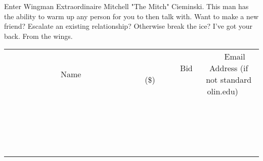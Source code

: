\documentclass[11pt]{article}
\begin{document}
Enter Wingman Extraordinaire Mitchell "The Mitch" Cieminski. This man has the ability to warm up any person for you to then talk with. Want to make a new friend? Escalate an existing relationship? Otherwise break the ice? I've got your back. From the wings.
\\[3ex]
\begin{tabular}{c c c}
~~~~~~~~~~~~~Name~~~~~~~~~~~~~ & ~~~~~~~~~Bid (\$)~~~~~~~~~  & ~~~Email Address (if not standard olin.edu)~~~\\
 & & \\
\hline
 & & \\
\hline
 & & \\
\hline
 & & \\
\hline
 & & \\
\hline
 & & \\
\hline
 & & \\
\hline
 & & \\
\hline
 & & \\
\hline
 & & \\
\hline
 & & \\
\hline
 & & \\
\hline
 & & \\
\hline
 & & \\
\hline
 & & \\
\hline
 & & \\
\hline
 & & \\
\hline
 & & \\
\hline
 & & \\
\hline
\end{tabular}
\newpage
\end{document}
